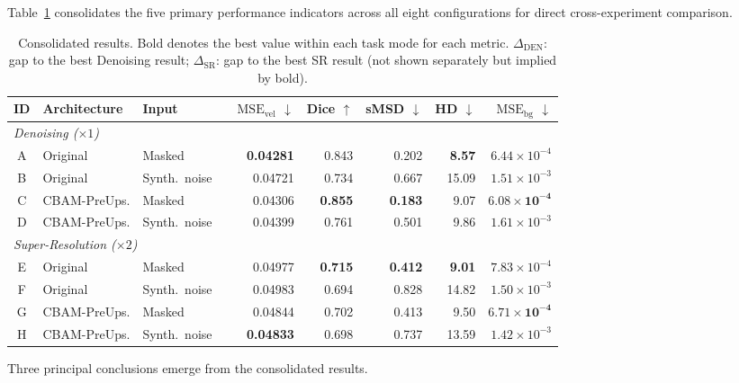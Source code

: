 Table~\ref{tab:summary} consolidates the five primary performance indicators across all eight
configurations for direct cross-experiment comparison.

\begin{table}[h!]
  \centering
  \caption{Consolidated results.  Bold denotes the best value within each task mode for each
  metric.  $\Delta_\text{DEN}$: gap to the best Denoising result;
  $\Delta_\text{SR}$: gap to the best SR result (not shown separately but implied by bold).}
  \label{tab:summary}
  \setlength{\tabcolsep}{4pt}
  \small
  \begin{tabular}{cll l rrrrr}
    \toprule
    ID & Architecture & Input & &
      $\text{MSE}_\text{vel}$ $\downarrow$ &
      Dice $\uparrow$ &
      sMSD $\downarrow$ &
      HD $\downarrow$ &
      $\text{MSE}_\text{bg}$ $\downarrow$ \\
    \midrule
    \multicolumn{9}{l}{\textit{Denoising ($\times 1$)}} \\
    \midrule
    A & Original      & Masked       & & \textbf{0.04281} & 0.843 & 0.202 & \textbf{8.57} & $6.44{\times}10^{-4}$ \\
    B & Original      & Synth.\ noise & & 0.04721 & 0.734 & 0.667 & 15.09 & $1.51{\times}10^{-3}$ \\
    C & CBAM-PreUps.  & Masked       & & 0.04306 & \textbf{0.855} & \textbf{0.183} & 9.07 & $\mathbf{6.08{\times}10^{-4}}$ \\
    D & CBAM-PreUps.  & Synth.\ noise & & 0.04399 & 0.761 & 0.501 & 9.86 & $1.61{\times}10^{-3}$ \\
    \midrule
    \multicolumn{9}{l}{\textit{Super-Resolution ($\times 2$)}} \\
    \midrule
    E & Original      & Masked       & & 0.04977 & \textbf{0.715} & \textbf{0.412} & \textbf{9.01} & $7.83{\times}10^{-4}$ \\
    F & Original      & Synth.\ noise & & 0.04983 & 0.694 & 0.828 & 14.82 & $1.50{\times}10^{-3}$ \\
    G & CBAM-PreUps.  & Masked       & & 0.04844 & 0.702 & 0.413 & 9.50 & $\mathbf{6.71{\times}10^{-4}}$ \\
    H & CBAM-PreUps.  & Synth.\ noise & & \textbf{0.04833} & 0.698 & 0.737 & 13.59 & $1.42{\times}10^{-3}$ \\
    \bottomrule
  \end{tabular}
\end{table}

Three principal conclusions emerge from the consolidated results.

